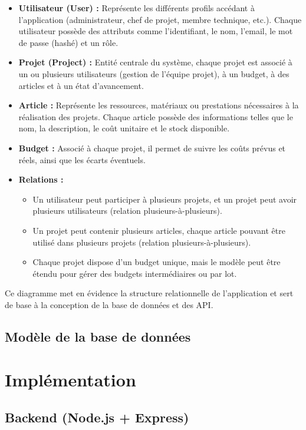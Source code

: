 \documentclass[12pt,a4paper]{report}
\begin{document}
\begin{itemize}
    \item \textbf{Utilisateur (User) :} Représente les différents profils accédant à l’application (administrateur, chef de projet, membre technique, etc.). Chaque utilisateur possède des attributs comme l’identifiant, le nom, l’email, le mot de passe (hashé) et un rôle.
    \item \textbf{Projet (Project) :} Entité centrale du système, chaque projet est associé à un ou plusieurs utilisateurs (gestion de l’équipe projet), à un budget, à des articles et à un état d’avancement.
    \item \textbf{Article :} Représente les ressources, matériaux ou prestations nécessaires à la réalisation des projets. Chaque article possède des informations telles que le nom, la description, le coût unitaire et le stock disponible.
    \item \textbf{Budget :} Associé à chaque projet, il permet de suivre les coûts prévus et réels, ainsi que les écarts éventuels.
    \item \textbf{Relations :} 
    \begin{itemize}
        \item Un utilisateur peut participer à plusieurs projets, et un projet peut avoir plusieurs utilisateurs (relation plusieurs-à-plusieurs).
        \item Un projet peut contenir plusieurs articles, chaque article pouvant être utilisé dans plusieurs projets (relation plusieurs-à-plusieurs).
        \item Chaque projet dispose d’un budget unique, mais le modèle peut être étendu pour gérer des budgets intermédiaires ou par lot.
    \end{itemize}
\end{itemize}

Ce diagramme met en évidence la structure relationnelle de l’application et sert de base à la conception de la base de données et des API.
\section{Modèle de la base de données}

\chapter{Implémentation}
\section{Backend (Node.js + Express)}
\end{document}
